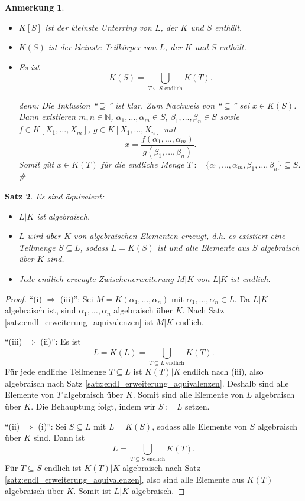 \documentclass[a4paper, twoside, 11pt, ngerman]{report}
\newcommand{\NN}{\mathds N}
\theoremstyle{definistyle}
\newtheorem{satz}{Satz}[section]
\newtheorem{anm}[satz]{Anmerkung}
\theoremstyle{remark}
\newenvironment{denn}%
  {\par\textit{denn:}}%
  {\hfill\#\par}
\begin{document}
\begin{anm}
\begin{itemize}
\item $K[S]$ ist der kleinste Unterring von $L$, der $K$ und $S$ enthält.
\item $K(S)$ ist der kleinste Teilkörper von $L$, der $K$ und $S$ enthält.
\item Es ist
\[
K(S) = \bigcup_{T \subseteq S \text{ endlich}} K(T).
\]
\begin{denn}
Die Inklusion "`$\supseteq$"' ist klar. Zum Nachweis von "`$\subseteq$"' sei $x \in K(S)$. Dann existieren $m,n \in \NN$, $\alpha_1, \dots, \alpha_m \in S$, $\beta_1, \dots, \beta_n \in S$ sowie $f\in K[X_1, \dots, X_m]$, $g\in K[X_1, \dots, X_n]$ mit
\[
x = \frac{f(\alpha_1, \dots, \alpha_m)}{g(\beta_1, \dots, \beta_n)}.
\]
Somit gilt $x \in K(T)$ für die endliche Menge $T := \{\alpha_1, \dots, \alpha_m, \beta_1, \dots, \beta_n\}\subseteq S$.
\end{denn}
\end{itemize}
\end{anm}

\begin{satz}\label{satz:algebraische_erweiterung_äquivalenz}
Es sind äquivalent:
\begin{itemize}
    \item[(i)] $L|K$ ist algebraisch.
    \item[(ii)] $L$ wird über $K$ von algebraischen Elementen erzeugt, d.h. es existiert eine Teilmenge $S \subseteq L$, sodass $L = K(S)$ ist und alle Elemente aus $S$ algebraisch über $K$ sind.
    \item[(iii)] Jede endlich erzeugte Zwischenerweiterung $M|K$ von $L|K$ ist endlich.
\end{itemize}
\end{satz}

\begin{proof}
"`(i) $\Rightarrow$ (iii)"': Sei $M = K(\alpha_1, \dots, \alpha_n)$ mit $\alpha_1, \dots, \alpha_n \in L$. Da $L|K$ algebraisch ist, sind $\alpha_1,\ldots,\alpha_n$ algebraisch über $K$. Nach Satz \ref{satz:endl_erweiterung_aquivalenzen} ist $M|K$ endlich.

"`(iii) $\Rightarrow$ (ii)"': Es ist
\[L = K(L) = \bigcup_{T \subseteq L \text{ endlich}} K(T).
\]
Für jede endliche Teilmenge $T \subseteq L$ ist $K(T)|K$ endlich nach (iii), also algebraisch nach Satz \ref{satz:endl_erweiterung_aquivalenzen}.
Deshalb sind alle Elemente von $T$ algebraisch über $K$. Somit sind alle Elemente von $L$ algebraisch über $K$. Die Behauptung folgt, indem wir $S:=L$ setzen.

"`(ii) $\Rightarrow$ (i)"': Sei $S \subseteq L$ mit $L = K(S)$, sodass alle Elemente von $S$ algebraisch über $K$ sind. Dann ist
\[
L = \bigcup_{T \subseteq S \text{ endlich}} K(T).
\]
Für $T \subseteq S$ endlich ist $K(T)|K$ algebraisch nach Satz \ref{satz:endl_erweiterung_aquivalenzen},  also sind alle Elemente aus $K(T)$ algebraisch über $K$. Somit ist $L|K$ algebraisch.
\end{proof}
\end{document}
